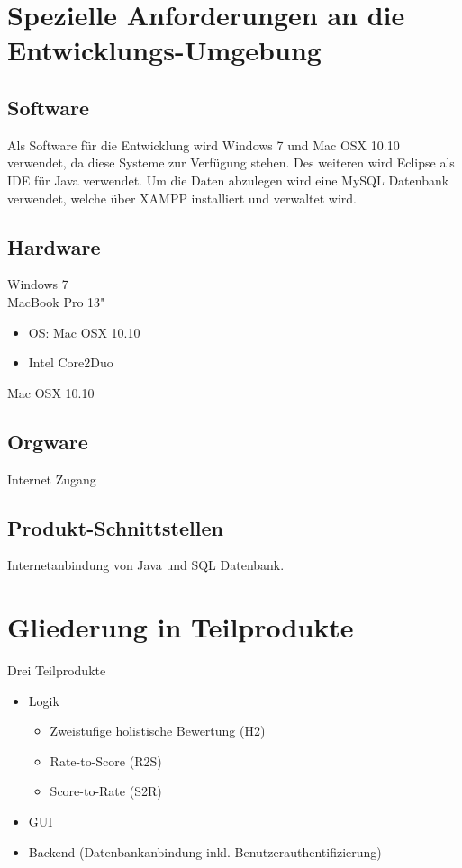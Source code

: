 \documentclass[a4paper,listof=leveldown,listof=numbered]{scrreprt}
\begin{document}
\chapter{Spezielle Anforderungen an die Entwicklungs-Umgebung}
	
	\section{Software}
	Als Software für die Entwicklung wird Windows 7 und Mac OSX 10.10 verwendet, da diese Systeme zur Verfügung stehen. Des weiteren wird Eclipse als IDE für Java verwendet. Um die Daten abzulegen wird eine MySQL Datenbank verwendet, welche über XAMPP installiert und verwaltet wird.
	\section{Hardware}
	Windows 7\\
	
	MacBook Pro 13"
	\begin{itemize}
		\item OS: Mac OSX 10.10
		\item Intel Core2Duo
	\end{itemize}
	Mac OSX 10.10
	
	\section{Orgware}
	Internet Zugang
	
	\section{Produkt-Schnittstellen}
	Internetanbindung von Java und SQL Datenbank.

	
\chapter{Gliederung in Teilprodukte}
	Drei Teilprodukte
	\begin{itemize}
		\item Logik 
			\begin{itemize}
				\item Zweistufige holistische Bewertung (H2)
				\item Rate-to-Score (R2S)
				\item Score-to-Rate (S2R)
			\end{itemize}
		\item GUI
		\item Backend (Datenbankanbindung inkl. Benutzerauthentifizierung)
	\end{itemize}
\end{document}
